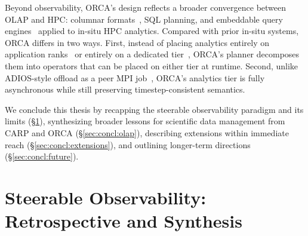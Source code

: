 Beyond observability, ORCA's design reflects a broader convergence between OLAP and HPC:
columnar formats~\cite{:ApacheArrow, :ApacheParquet}, SQL planning, and embeddable query
engines~\cite{Lamb2024:DataFusion} applied to in-situ HPC analytics.
Compared with prior in-situ systems, ORCA differs in two ways.
First, instead of placing analytics entirely on application
ranks~\cite{Zheng2018:DeltaFS,Jain2024:CARP} or entirely on a dedicated
tier~\cite{Eisen2025:ADIOS}, ORCA's planner decomposes them into operators that can be placed on
either tier at runtime.
Second, unlike ADIOS-style offload as a peer MPI job~\cite{Eisen2025:ADIOS}, ORCA's analytics tier
is fully asynchronous while still preserving timestep-consistent semantics.

We conclude this thesis by recapping the steerable observability paradigm and its limits
(\S\ref{sec:concl:retrospective}), synthesizing broader lessons for scientific data management
from CARP and ORCA (\S\ref{sec:concl:olap}), describing extensions within immediate reach
(\S\ref{sec:concl:extensions}), and outlining longer-term directions (\S\ref{sec:concl:future}).



\section{Steerable Observability: Retrospective and Synthesis}\label{sec:concl:retrospective}


